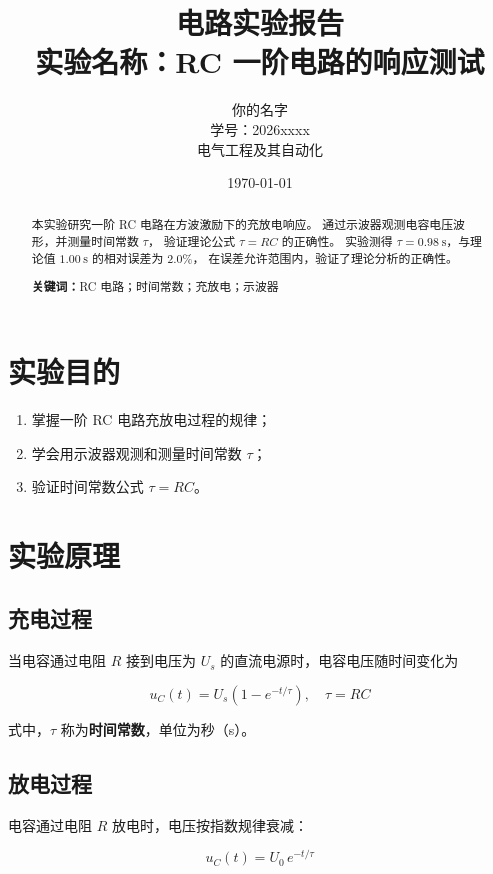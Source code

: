 \documentclass[12pt, a4paper]{ctexart}
\title{\textbf{电路实验报告}\\[0.3em]
       \large 实验名称：RC 一阶电路的响应测试}
\author{你的名字 \\ 学号：2026xxxx \\ 电气工程及其自动化}
\date{\today}
\begin{document}
\maketitle

\begin{abstract}
本实验研究一阶 RC 电路在方波激励下的充放电响应。
通过示波器观测电容电压波形，并测量时间常数 $\tau$，
验证理论公式 $\tau = RC$ 的正确性。
实验测得 $\tau = 0.98\ \mathrm{s}$，与理论值 $1.00\ \mathrm{s}$ 的相对误差为 $2.0\%$，
在误差允许范围内，验证了理论分析的正确性。

\noindent\textbf{关键词：}RC 电路；时间常数；充放电；示波器
\end{abstract}

\section{实验目的}
\begin{enumerate}
    \item 掌握一阶 RC 电路充放电过程的规律；
    \item 学会用示波器观测和测量时间常数 $\tau$；
    \item 验证时间常数公式 $\tau = RC$。
\end{enumerate}

\section{实验原理}

\subsection{充电过程}
当电容通过电阻 $R$ 接到电压为 $U_s$ 的直流电源时，电容电压随时间变化为

\begin{equation}\label{eq:charge}
    u_C(t) = U_s \left( 1 - e^{-t/\tau} \right), \quad \tau = RC
\end{equation}

式中，$\tau$ 称为\textbf{时间常数}，单位为秒（s）。

\subsection{放电过程}
电容通过电阻 $R$ 放电时，电压按指数规律衰减：

\begin{equation}\label{eq:discharge}
    u_C(t) = U_0 \, e^{-t/\tau}
\end{equation}
\end{document}
